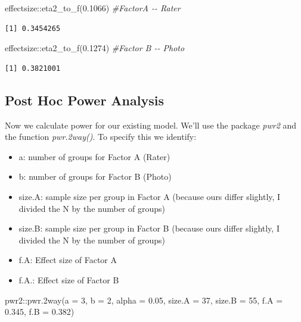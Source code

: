 \documentclass[
  11pt,
]{book}
\newenvironment{Shaded}{\begin{snugshade}}{\end{snugshade}}
\newcommand{\AttributeTok}[1]{\textcolor[rgb]{0.77,0.63,0.00}{#1}}
\newcommand{\CommentTok}[1]{\textcolor[rgb]{0.56,0.35,0.01}{\textit{#1}}}
\newcommand{\DecValTok}[1]{\textcolor[rgb]{0.00,0.00,0.81}{#1}}
\newcommand{\FloatTok}[1]{\textcolor[rgb]{0.00,0.00,0.81}{#1}}
\newcommand{\FunctionTok}[1]{\textcolor[rgb]{0.00,0.00,0.00}{#1}}
\newcommand{\NormalTok}[1]{#1}
\newcommand{\SpecialCharTok}[1]{\textcolor[rgb]{0.00,0.00,0.00}{#1}}
\providecommand{\tightlist}{%
  \setlength{\itemsep}{0pt}\setlength{\parskip}{0pt}}
\begin{document}
\begin{Shaded}
\begin{Highlighting}[]
\NormalTok{effectsize}\SpecialCharTok{::}\FunctionTok{eta2\_to\_f}\NormalTok{(}\FloatTok{0.1066}\NormalTok{)  }\CommentTok{\#FactorA {-}{-} Rater}
\end{Highlighting}
\end{Shaded}

\begin{verbatim}
[1] 0.3454265
\end{verbatim}

\begin{Shaded}
\begin{Highlighting}[]
\NormalTok{effectsize}\SpecialCharTok{::}\FunctionTok{eta2\_to\_f}\NormalTok{(}\FloatTok{0.1274}\NormalTok{)  }\CommentTok{\#Factor B {-}{-} Photo}
\end{Highlighting}
\end{Shaded}

\begin{verbatim}
[1] 0.3821001
\end{verbatim}

\hypertarget{post-hoc-power-analysis}{%
\subsection{Post Hoc Power Analysis}\label{post-hoc-power-analysis}}

Now we calculate power for our existing model. We'll use the package \emph{pwr2} and the function \emph{pwr.2way()}. To specify this we identify:

\begin{itemize}
\tightlist
\item
  a: number of groups for Factor A (Rater)
\item
  b: number of groups for Factor B (Photo)
\item
  size.A: sample size per group in Factor A (because ours differ slightly, I divided the N by the number of groups)
\item
  size.B: sample size per group in Factor B (because ours differ slightly, I divided the N by the number of groups)
\item
  f.A: Effect size of Factor A
\item
  f.A.: Effect size of Factor B
\end{itemize}

\begin{Shaded}
\begin{Highlighting}[]
\NormalTok{pwr2}\SpecialCharTok{::}\FunctionTok{pwr.2way}\NormalTok{(}\AttributeTok{a =} \DecValTok{3}\NormalTok{, }\AttributeTok{b =} \DecValTok{2}\NormalTok{, }\AttributeTok{alpha =} \FloatTok{0.05}\NormalTok{, }\AttributeTok{size.A =} \DecValTok{37}\NormalTok{, }\AttributeTok{size.B =} \DecValTok{55}\NormalTok{, }\AttributeTok{f.A =} \FloatTok{0.345}\NormalTok{,}
    \AttributeTok{f.B =} \FloatTok{0.382}\NormalTok{)}
\end{Highlighting}
\end{Shaded}
\end{document}
